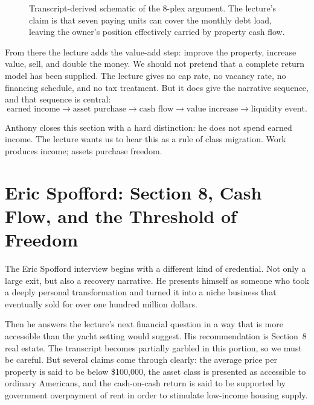 \begin{figure}[h]
\centering
{}
\caption{Transcript-derived schematic of the 8-plex argument. The lecture's claim is that seven paying units can cover the monthly debt load, leaving the owner's position effectively carried by property cash flow.}
\end{figure}

From there the lecture adds the value-add step: improve the property, increase value, sell, and double the money. We should not pretend that a complete return model has been supplied. The lecture gives no cap rate, no vacancy rate, no financing schedule, and no tax treatment. But it does give the narrative sequence, and that sequence is central:
\[
\text{earned income} \longrightarrow \text{asset purchase} \longrightarrow \text{cash flow} \longrightarrow \text{value increase} \longrightarrow \text{liquidity event}.
\]

Anthony closes this section with a hard distinction: he does not spend earned income. The lecture wants us to hear this as a rule of class migration. Work produces income; assets purchase freedom.

\section{Eric Spofford: Section 8, Cash Flow, and the Threshold of Freedom}

The Eric Spofford interview begins with a different kind of credential. Not only a large exit, but also a recovery narrative. He presents himself as someone who took a deeply personal transformation and turned it into a niche business that eventually sold for over one hundred million dollars.

Then he answers the lecture's next financial question in a way that is more accessible than the yacht setting would suggest. His recommendation is Section~8 real estate. The transcript becomes partially garbled in this portion, so we must be careful. But several claims come through clearly: the average price per property is said to be below \$100{,}000, the asset class is presented as accessible to ordinary Americans, and the cash-on-cash return is said to be supported by government overpayment of rent in order to stimulate low-income housing supply.

